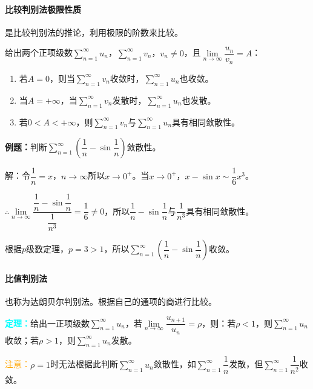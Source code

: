 \documentclass[UTF8, 12pt]{ctexart}
\begin{document}
\paragraph{比较判别法极限性质} \leavevmode \medskip

是比较判别法的推论，利用极限的阶数来比较。

给出两个正项级数$\sum\limits_{n=1}^\infty u_n$，$\sum\limits_{n=1}^\infty v_n$，$v_n\neq0$，且$\lim\limits_{n\to\infty}\dfrac{u_n}{v_n}=A$：

\begin{enumerate}
    \item 若$A=0$，则当$\sum\limits_{n=1}^\infty v_n$收敛时，$\sum\limits_{n=1}^\infty u_n$也收敛。
    \item 当$A=+\infty$，当$\sum\limits_{n=1}^\infty v_n$发散时，$\sum\limits_{n=1}^\infty u_n$也发散。
    \item 若$0<A<+\infty$，则$\sum\limits_{n=1}^\infty v_n$与$\sum\limits_{n=1}^\infty u_n$具有相同敛散性。
\end{enumerate}

\textbf{例题：}判断$\sum\limits_{n=1}^\infty\left(\dfrac{1}{n}-\sin\dfrac{1}{n}\right)$敛散性。

解：令$\dfrac{1}{n}=x$，$n\to\infty$所以$x\to0^+$。当$x\to0^+$，$x-\sin x\sim\dfrac{1}{6}x^3$。

$\therefore\lim\limits_{n\to\infty}\dfrac{\dfrac{1}{n}-\sin\dfrac{1}{n}}{\dfrac{1}{n^3}}=\dfrac{1}{6}\neq0$，所以$\dfrac{1}{n}-\sin\dfrac{1}{n}$与$\dfrac{1}{n^3}$具有相同敛散性。

根据$p$级数定理，$p=3>1$，所以$\sum\limits_{n=1}^\infty\left(\dfrac{1}{n}-\sin\dfrac{1}{n}\right)$收敛。

\paragraph{比值判别法} \leavevmode \medskip

也称为达朗贝尔判别法。根据自己的通项的商进行比较。

\textcolor{aqua}{\textbf{定理：}}给出一正项级数$\sum\limits_{n=1}^\infty u_n$，若$\lim\limits_{n\to\infty}\dfrac{u_{n+1}}{u_n}=\rho$，则：若$\rho<1$，则$\sum\limits_{n=1}^\infty u_n$收敛；若$\rho>1$，则$\sum\limits_{n=1}^\infty u_n$发散。

\textcolor{orange}{注意：}$\rho=1$时无法根据此判断$\sum\limits_{n=1}^\infty u_n$敛散性，如$\sum\limits_{n=1}^\infty\dfrac{1}{n}$发散，但$\sum\limits_{n=1}^\infty\dfrac{1}{n^2}$收敛。
\end{document}
